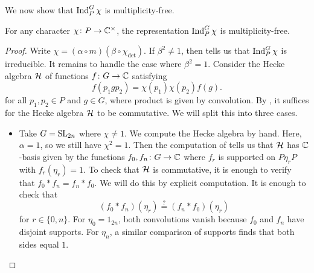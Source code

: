 We now show that $\operatorname{Ind}_P^G\chi$ is multiplicity-free.
\begin{proposition} \label{prop:ind-mult-free}
    For any character $\chi\colon P\to\mathbb C^\times$, the representation $\operatorname{Ind}_P^G\chi$ is multiplicity-free.
\end{proposition}
\begin{proof}
    Write $\chi=(\alpha\circ m)(\beta\circ\chi_{\det})$. If $\beta^2\ne1$, then  tells us that $\operatorname{Ind}_P^G\chi$ is irreducible. It remains to handle the case where $\beta^2=1$. Consider the Hecke algebra $\mathcal{H}$ of functions $f\colon G\to\mathbb C$ satisfying
    \[f(p_1gp_2)=\chi(p_1)\chi(p_2)f(g).\]
    for all $p_1,p_2\in P$ and $g\in G$, where product is given by convolution. By \cite[Theorem~45.1]{bump-lie-group}, it suffices for the Hecke algebra $\mathcal{H}$ to be commutative. We will split this into three cases.
    \begin{itemize}
        \item Take $G=\mathrm{SL}_{2n}$ where $\chi\ne1$. We compute the Hecke algebra by hand. Here, $\alpha=1$, so we still have $\chi^2=1$. Then the computation of  tells us that $\mathcal{H}$ has $\mathbb C$-basis given by the functions $f_0,f_n\colon G\to\mathbb C$ where $f_r$ is supported on $P\eta_rP$ with $f_r(\eta_r)=1$. To check that $\mathcal{H}$ is commutative, it is enough to verify that $f_0*f_n=f_n*f_0$. We will do this by explicit computation. It is enough to check that
        \[(f_0*f_n)(\eta_r)\stackrel?=(f_n*f_0)(\eta_r)\]
        for $r\in\{0,n\}$. For $\eta_0=1_{2n}$, both convolutions vanish because $f_0$ and $f_n$ have disjoint supports. For $\eta_n$, a similar comparison of supports finds that both sides equal $1$.
        
        

\end{itemize}
\end{proof}
